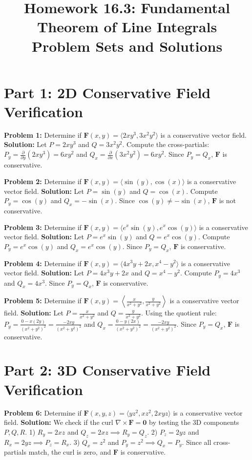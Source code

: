\documentclass[12pt]{article}
\title{Homework 16.3: Fundamental Theorem of Line Integrals \\ \Large Problem Sets and Solutions}
\author{}
\date{}
\begin{document}
\maketitle

\section*{Part 1: 2D Conservative Field Verification}

\textbf{Problem 1:} Determine if $\mathbf{F}(x,y) = \langle 2xy^3, 3x^2y^2 \rangle$ is a conservative vector field.
\textbf{Solution:} Let $P = 2xy^3$ and $Q = 3x^2y^2$. 
Compute the cross-partials: $P_y = \frac{\partial}{\partial y}(2xy^3) = 6xy^2$ and $Q_x = \frac{\partial}{\partial x}(3x^2y^2) = 6xy^2$. 
Since $P_y = Q_x$, $\mathbf{F}$ is conservative.

\textbf{Problem 2:} Determine if $\mathbf{F}(x,y) = \langle \sin(y), \cos(x) \rangle$ is a conservative vector field.
\textbf{Solution:} Let $P = \sin(y)$ and $Q = \cos(x)$. 
Compute $P_y = \cos(y)$ and $Q_x = -\sin(x)$. 
Since $\cos(y) \neq -\sin(x)$, $\mathbf{F}$ is not conservative.

\textbf{Problem 3:} Determine if $\mathbf{F}(x,y) = \langle e^x \sin(y), e^x \cos(y) \rangle$ is a conservative vector field.
\textbf{Solution:} Let $P = e^x \sin(y)$ and $Q = e^x \cos(y)$. 
Compute $P_y = e^x \cos(y)$ and $Q_x = e^x \cos(y)$. 
Since $P_y = Q_x$, $\mathbf{F}$ is conservative.

\textbf{Problem 4:} Determine if $\mathbf{F}(x,y) = \langle 4x^3 y + 2x, x^4 - y^2 \rangle$ is a conservative vector field.
\textbf{Solution:} Let $P = 4x^3 y + 2x$ and $Q = x^4 - y^2$. 
Compute $P_y = 4x^3$ and $Q_x = 4x^3$. 
Since $P_y = Q_x$, $\mathbf{F}$ is conservative.

\textbf{Problem 5:} Determine if $\mathbf{F}(x,y) = \left\langle \frac{x}{x^2+y^2}, \frac{y}{x^2+y^2} \right\rangle$ is a conservative vector field.
\textbf{Solution:} Let $P = \frac{x}{x^2+y^2}$ and $Q = \frac{y}{x^2+y^2}$. 
Using the quotient rule: 
$P_y = \frac{0 - x(2y)}{(x^2+y^2)^2} = \frac{-2xy}{(x^2+y^2)^2}$ and 
$Q_x = \frac{0 - y(2x)}{(x^2+y^2)^2} = \frac{-2xy}{(x^2+y^2)^2}$. 
Since $P_y = Q_x$, $\mathbf{F}$ is conservative.

\section*{Part 2: 3D Conservative Field Verification}

\textbf{Problem 6:} Determine if $\mathbf{F}(x,y,z) = \langle yz^2, xz^2, 2xyz \rangle$ is a conservative vector field.
\textbf{Solution:} We check if the curl $\nabla \times \mathbf{F} = \mathbf{0}$ by testing the 3D components $P, Q, R$.
1) $R_y = 2xz$ and $Q_z = 2xz \implies R_y = Q_z$.
2) $P_z = 2yz$ and $R_x = 2yz \implies P_z = R_x$.
3) $Q_x = z^2$ and $P_y = z^2 \implies Q_x = P_y$.
Since all cross-partials match, the curl is zero, and $\mathbf{F}$ is conservative.
\end{document}

